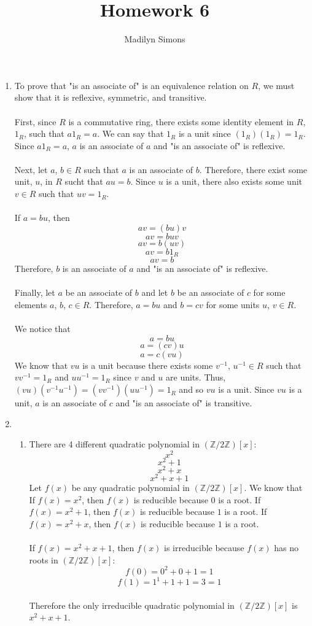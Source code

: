 \documentclass{article}
\title{Homework 6}
\author{Madilyn Simons}
\date{}
\newcommand{\Z}{\mathbb{Z}}
\begin{document}
\maketitle

\begin{enumerate}

\item To prove that "is an associate of" is an equivalence relation on $R$, we
must show that it is reflexive, symmetric, and transitive.
\\
\\
First, since $R$ is a commutative ring, there exists some identity element in
$R$, $1_R$, such that $a1_R = a$.  We can say that $1_R$ is a unit since
$(1_{R})  (1_{R}) = 1_{R}$.  Since $a1_R = a$, $a$ is an associate of $a$
and "is an associate of" is reflexive.
\\
\\
Next, let $a$, $b \in R$ such that $a$ is an associate of $b$.  Therefore,
there exist some unit, $u$, in $R$ sucht that $au = b$.  Since $u$ is a unit,
there also exists some unit $v \in R$ such that $uv = 1_R$.
\\
\\
If $a = bu$, then
\[
av = (bu)v
\] \[
av = buv
\] \[
av = b(uv)
\] \[
av = b1_{R}
\] \[
av = b
\]
Therefore, $b$ is an associate of $a$ and "is an associate of" is reflexive.
\\
\\
Finally, let $a$ be an associate of $b$ and let $b$ be an associate of $c$ for
some elements $a$, $b$, $c \in R$.  Therefore, $a = bu$ and $b = cv$ for some
units $u$, $v \in R$.
\\
\\
We notice that
\[
a = bu
\] \[
a = (cv)u
\] \[
a = c(vu)
\]
We know that $vu$ is a unit because there exists some
$v^{-1}$, $u^{-1} \in R$ such that $vv^{-1} = 1_R$ and $uu^{-1} = 1_R$ since
$v$ and $u$ are units.  Thus, $(vu)(v^{-1}u^{-1}) = (vv^{-1})(uu^{-1}) = 1_R$
and so $vu$ is a unit.  Since $vu$ is a unit, $a$ is an associate of $c$ and
"is an associate of" is transitive.

\item
\begin{enumerate}
\item There are 4 different quadratic polynomial in $(\Z/2\Z)[x]$:
\[
x^2
\] \[
x^2 + 1
\] \[
x^2 + x
\] \[
x^2 + x + 1
\]
Let $f(x)$ be any quadratic polynomial in $(\Z/2\Z)[x]$.  We know that
If $f(x) = x^2$, then $f(x)$ is reducible because $0$ is a root.
If $f(x) = x^2 + 1$, then $f(x)$ is reducible because $1$ is a root.
If $f(x) = x^2 + x$, then $f(x)$ is reducible because $1$ is a root.
\\ \\
If $f(x) = x^2 + x + 1$, then $f(x)$ is irreducible because $f(x)$ has no roots
in $(\Z/2\Z)[x]$:
\[
f(0) = 0^2 + 0 + 1 = 1
\] \[
f(1) = 1^1 + 1 + 1 = 3 = 1
\]
\\
Therefore the only irreducible quadratic polynomial in $(\Z/2\Z)[x]$ is
$x^2 + x + 1$.


\end{enumerate}
\end{enumerate}
\end{document}
